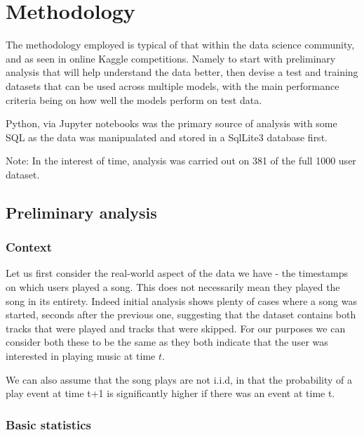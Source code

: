 
\chapter{Methodology} %

\label{Chapter3} %

The methodology employed is typical of that within the data science community, and as seen in online Kaggle competitions. Namely to start with preliminary analysis that will help understand the data better, then devise a test and training datasets that can be used across multiple models, with the main performance criteria being on how well the models perform on test data.

Python, via Jupyter notebooks was the primary source of analysis with some SQL as the data was manipualated and stored in a SqlLite3 database first.

Note: In the interest of time, analysis was carried out on 381 of the full 1000 user dataset.

\section{Preliminary analysis}

\subsection{Context}

Let us first consider the real-world aspect of the data we have - the timestamps on which users played a song. This does not necessarily mean they played the song in its entirety. Indeed initial analysis shows plenty of cases where a song was started, seconds after the previous one, suggesting that the dataset contains both tracks that were played and tracks that were skipped. For our purposes we can consider both these to be the same as they both indicate that the user was interested in playing music at time $t$.

We can also assume that the song plays are not i.i.d, in that the probability of a play event at time t+1 is significantly higher if there was an event at time t. 

\subsection{Basic statistics} 


